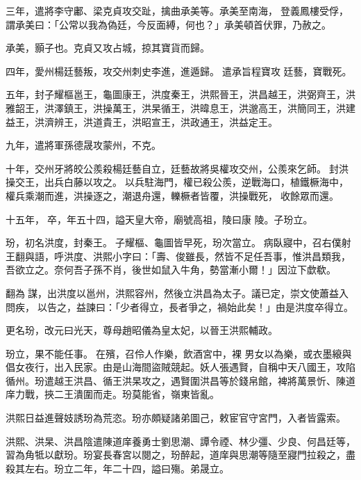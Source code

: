 \begin{pinyinscope}
 三年，遣將李守鄘、梁克貞攻交趾，擒曲承美等。承美至南海，登義鳳樓受俘，謂承美曰：「公常以我為偽廷，今反面縛，何也？」承美頓首伏罪，乃赦之。



 承美，顥子也。克貞又攻占城，掠其寶貨而歸。



 四年，愛州楊廷藝叛，攻交州刺史李進，進遁歸。遣承旨程寶攻
 廷藝，寶戰死。



 五年，封子耀樞邕王，龜圖康王，洪度秦王，洪熙晉王，洪昌越王，洪弼齊王，洪雅韶王，洪澤鎮王，洪操萬王，洪杲循王，洪暐息王，洪邈高王，洪簡同王，洪建益王，洪濟辨王，洪道貴王，洪昭宣王，洪政通王，洪益定王。



 九年，遣將軍孫德晟攻蒙州，不克。



 十年，交州牙將皎公羨殺楊廷藝自立，廷藝故將吳權攻交州，公羨來乞師。封洪操交王，出兵白藤以攻之。以兵駐海門，權已殺公羨，逆戰海口，植鐵橛海中，權兵乘潮而進，洪操逐之，潮退舟還，轢橛者皆覆，洪操戰死，收餘眾而還。



 十五年，卒，年五十四，謚天皇大帝，廟號高祖，陵曰康
 陵。子玢立。



 玢，初名洪度，封秦王。子耀樞、龜圖皆早死，玢次當立。病臥寢中，召右僕射王翻與語，呼洪度、洪熙小字曰：「壽、俊雖長，然皆不足任吾事，惟洪昌類我，吾欲立之。奈何吾子孫不肖，後世如鼠入牛角，勢當漸小爾！」因泣下歔欷。



 翻為謀，出洪度以邕州，洪熙容州，然後立洪昌為太子。議已定，崇文使蕭益入問疾，以告之，益諫曰：「少者得立，長者爭之，禍始此矣！」由是洪度卒得立。



 更名玢，改元曰光天，尊母趙昭儀為皇太妃，以晉王洪熙輔政。



 玢立，果不能任事。在殯，召伶人作樂，飲酒宮中，裸
 男女以為樂，或衣墨縗與倡女夜行，出入民家。由是山海間盜賊競起。妖人張遇賢，自稱中天八國王，攻陷循州。玢遣越王洪昌、循王洪杲攻之，遇賢圍洪昌等於錢帛館，裨將萬景忻、陳道庠力戰，挾二王潰圍而走。玢莫能省，嶺東皆亂。



 洪熙日益進聲妓誘玢為荒恣。玢亦頗疑諸弟圖己，敕宦官守宮門，入者皆露索。



 洪熙、洪杲、洪昌陰遣陳道庠養勇士劉思潮、譚令禋、林少彊、少良、何昌廷等，習為角牴以獻玢。玢宴長春宮以閱之，玢醉起，道庠與思潮等隨至寢門拉殺之，盡殺其左右。玢立二年，年二十四，謚曰殤。弟晟立。




\end{pinyinscope}
